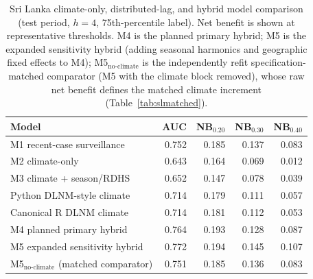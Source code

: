 \documentclass[11pt,a4paper]{article}
\begin{document}
\begin{table}[htbp]
\centering
\caption{Sri Lanka climate-only, distributed-lag, and hybrid model comparison (test period, $h=4$, 75th-percentile label). Net benefit is shown at representative thresholds. M4 is the planned primary hybrid; M5 is the expanded sensitivity hybrid (adding seasonal harmonics and geographic fixed effects to M4); M5$_{\text{no-climate}}$ is the independently refit specification-matched comparator (M5 with the climate block removed), whose raw net benefit defines the matched climate increment (Table~\ref{tab:slmatched}).}
\label{tab:dlnmhybrid}
\small
\begin{tabular}{lrrrr}
\toprule
Model & AUC & NB$_{0.20}$ & NB$_{0.30}$ & NB$_{0.40}$ \\
\midrule
M1 recent-case surveillance & 0.752 & 0.185 & 0.137 & 0.083 \\
M2 climate-only & 0.643 & 0.164 & 0.069 & 0.012 \\
M3 climate + season/RDHS & 0.652 & 0.147 & 0.078 & 0.039 \\
Python DLNM-style climate & 0.714 & 0.179 & 0.111 & 0.057 \\
Canonical R DLNM climate & 0.714 & 0.181 & 0.112 & 0.053 \\
M4 planned primary hybrid & 0.764 & 0.193 & 0.128 & 0.087 \\
M5 expanded sensitivity hybrid & 0.772 & 0.194 & 0.145 & 0.107 \\
M5$_{\text{no-climate}}$ (matched comparator) & 0.751 & 0.185 & 0.136 & 0.083 \\
\bottomrule
\end{tabular}
\end{table}
\end{document}
